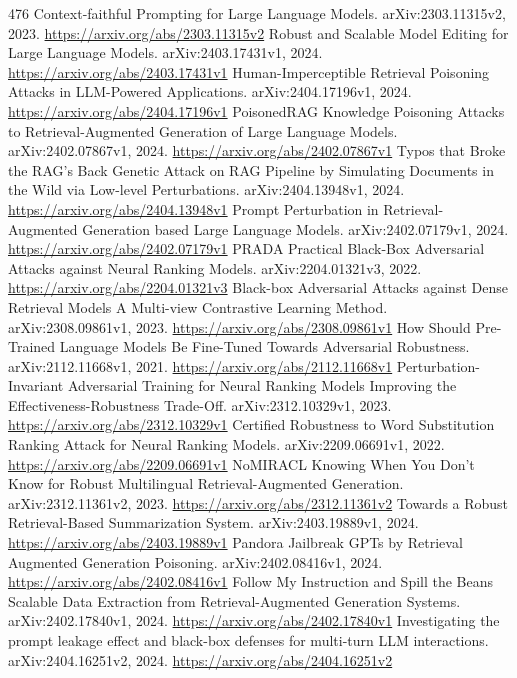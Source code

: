 \documentclass[11pt]{article}
\begin{document}
\begin{thebibliography}{476}
 Context-faithful Prompting for Large Language Models. arXiv:2303.11315v2, 2023. \url{https://arxiv.org/abs/2303.11315v2}
 Robust and Scalable Model Editing for Large Language Models. arXiv:2403.17431v1, 2024. \url{https://arxiv.org/abs/2403.17431v1}
 Human-Imperceptible Retrieval Poisoning Attacks in LLM-Powered Applications. arXiv:2404.17196v1, 2024. \url{https://arxiv.org/abs/2404.17196v1}
 PoisonedRAG Knowledge Poisoning Attacks to Retrieval-Augmented Generation of Large Language Models. arXiv:2402.07867v1, 2024. \url{https://arxiv.org/abs/2402.07867v1}
 Typos that Broke the RAG's Back Genetic Attack on RAG Pipeline by Simulating Documents in the Wild via Low-level Perturbations. arXiv:2404.13948v1, 2024. \url{https://arxiv.org/abs/2404.13948v1}
 Prompt Perturbation in Retrieval-Augmented Generation based Large Language Models. arXiv:2402.07179v1, 2024. \url{https://arxiv.org/abs/2402.07179v1}
 PRADA Practical Black-Box Adversarial Attacks against Neural Ranking Models. arXiv:2204.01321v3, 2022. \url{https://arxiv.org/abs/2204.01321v3}
 Black-box Adversarial Attacks against Dense Retrieval Models A Multi-view Contrastive Learning Method. arXiv:2308.09861v1, 2023. \url{https://arxiv.org/abs/2308.09861v1}
 How Should Pre-Trained Language Models Be Fine-Tuned Towards Adversarial Robustness. arXiv:2112.11668v1, 2021. \url{https://arxiv.org/abs/2112.11668v1}
 Perturbation-Invariant Adversarial Training for Neural Ranking Models Improving the Effectiveness-Robustness Trade-Off. arXiv:2312.10329v1, 2023. \url{https://arxiv.org/abs/2312.10329v1}
 Certified Robustness to Word Substitution Ranking Attack for Neural Ranking Models. arXiv:2209.06691v1, 2022. \url{https://arxiv.org/abs/2209.06691v1}
 NoMIRACL Knowing When You Don't Know for Robust Multilingual Retrieval-Augmented Generation. arXiv:2312.11361v2, 2023. \url{https://arxiv.org/abs/2312.11361v2}
 Towards a Robust Retrieval-Based Summarization System. arXiv:2403.19889v1, 2024. \url{https://arxiv.org/abs/2403.19889v1}
 Pandora Jailbreak GPTs by Retrieval Augmented Generation Poisoning. arXiv:2402.08416v1, 2024. \url{https://arxiv.org/abs/2402.08416v1}
 Follow My Instruction and Spill the Beans Scalable Data Extraction from Retrieval-Augmented Generation Systems. arXiv:2402.17840v1, 2024. \url{https://arxiv.org/abs/2402.17840v1}
 Investigating the prompt leakage effect and black-box defenses for multi-turn LLM interactions. arXiv:2404.16251v2, 2024. \url{https://arxiv.org/abs/2404.16251v2}

\end{thebibliography}
\end{document}
